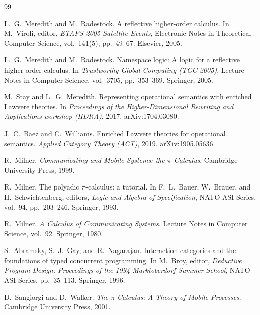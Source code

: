 \documentclass[11pt]{article}
\theoremstyle{definition}
\theoremstyle{plain}
\begin{document}
\begin{thebibliography}{99}

L.~G.~Meredith and M.~Radestock.
\newblock A reflective higher-order calculus.
\newblock In M.~Viroli, editor, \emph{ETAPS 2005 Satellite Events},
  Electronic Notes in Theoretical Computer Science, vol.~141(5),
  pp.~49--67. Elsevier, 2005.

L.~G.~Meredith and M.~Radestock.
\newblock Namespace logic: A logic for a reflective higher-order calculus.
\newblock In \emph{Trustworthy Global Computing (TGC 2005)}, Lecture Notes
  in Computer Science, vol.~3705, pp.~353--369. Springer, 2005.

M.~Stay and L.~G.~Meredith.
\newblock Representing operational semantics with enriched Lawvere theories.
\newblock In \emph{Proceedings of the Higher-Dimensional Rewriting and
  Applications workshop (HDRA)}, 2017.
  \newblock arXiv:1704.03080.

J.~C.~Baez and C.~Williams.
\newblock Enriched Lawvere theories for operational semantics.
\newblock \emph{Applied Category Theory (ACT)}, 2019.
  \newblock arXiv:1905.05636.

R.~Milner.
\newblock \emph{Communicating and Mobile Systems: the $\pi$-Calculus}.
\newblock Cambridge University Press, 1999.

R.~Milner.
\newblock The polyadic $\pi$-calculus: a tutorial.
\newblock In F.~L.~Bauer, W.~Brauer, and H.~Schwichtenberg, editors,
  \emph{Logic and Algebra of Specification}, NATO ASI Series, vol.~94,
  pp.~203--246. Springer, 1993.

R.~Milner.
\newblock \emph{A Calculus of Communicating Systems}.
\newblock Lecture Notes in Computer Science, vol.~92. Springer, 1980.

S.~Abramsky, S.~J.~Gay, and R.~Nagarajan.
\newblock Interaction categories and the foundations of typed concurrent
  programming.
\newblock In M.~Broy, editor, \emph{Deductive Program Design:
  Proceedings of the 1994 Marktoberdorf Summer School}, NATO ASI Series,
  pp.~35--113. Springer, 1996.

D.~Sangiorgi and D.~Walker.
\newblock \emph{The $\pi$-Calculus: A Theory of Mobile Processes}.
\newblock Cambridge University Press, 2001.


\end{thebibliography}
\end{document}
